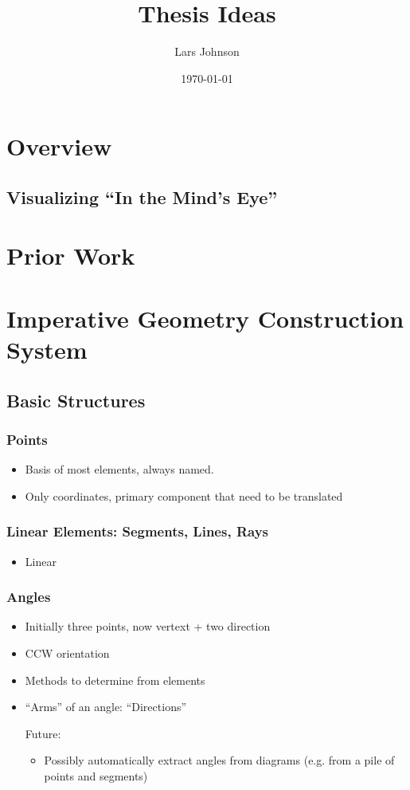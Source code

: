 \documentclass[11pt]{article}
\title{Thesis Ideas}
\author{Lars Johnson}
\date{\today}
\begin{document}
\maketitle

\section{Overview}
\label{sec-1}
\subsection{Visualizing ``In the Mind's Eye''}
\label{sec-1-1}
\section{Prior Work}
\label{sec-2}
\section{Imperative Geometry Construction System}
\label{sec-3}
\subsection{Basic Structures}
\label{sec-3-1}
\subsubsection{Points}
\label{sec-3-1-1}

\begin{itemize}
\item Basis of most elements, always named.
\item Only coordinates, primary component that need to be translated
\end{itemize}
\subsubsection{Linear Elements: Segments, Lines, Rays}
\label{sec-3-1-2}

\begin{itemize}
\item Linear
\end{itemize}
\subsubsection{Angles}
\label{sec-3-1-3}

\begin{itemize}
\item Initially three points, now vertext + two direction
\item CCW orientation
\item Methods to determine from elements
\item ``Arms'' of an angle: ``Directions''
\item[Future:]
\begin{itemize}
\item Possibly automatically extract angles from diagrams
        (e.g. from a pile of points and segments)
\end{itemize}
\end{itemize}
\end{document}
